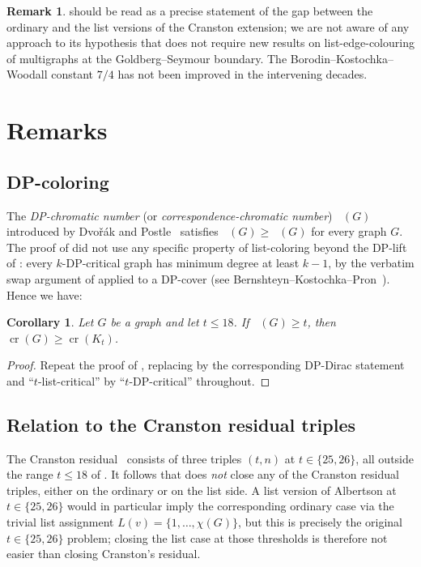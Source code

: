 \documentclass[11pt,a4paper]{article}
\newtheorem{corollary}[theorem]{Corollary}
\theoremstyle{definition}
\newtheorem{remark}[theorem]{Remark}
\DeclareMathOperator{\crN}{cr}
\DeclareMathOperator{\chl}{\chi_{\ell}}
\DeclareMathOperator{\chDP}{\chi_{\mathrm{DP}}}
\begin{document}
\begin{remark}
 should be read as a precise statement of
the gap between the ordinary and the list versions of the
Cranston extension; we are not aware of any approach to its
hypothesis that does not require new results on
list-edge-colouring of multigraphs at the Goldberg--Seymour
boundary. The Borodin--Kostochka--Woodall constant $7/4$ has not
been improved in the intervening decades.
\end{remark}

\section{Remarks}\label{sec:remarks}

\subsection{DP-coloring}

The \emph{DP-chromatic number} (or \emph{correspondence-chromatic
number}) $\chDP(G)$ introduced by Dvo\v{r}\'ak and
Postle~\cite{DP} satisfies $\chDP(G) \ge \chl(G)$ for every graph
$G$. The proof of  did not use any specific
property of list-coloring beyond the DP-lift of
: every $k$-DP-critical graph has minimum
degree at least $k - 1$, by the verbatim swap argument of
 applied to a DP-cover (see
Bernshteyn--Kostochka--Pron~\cite{BKP}). Hence we have:

\begin{corollary}\label{cor:dp}
Let $G$ be a graph and let $t \le 18$. If $\chDP(G) \ge t$, then
$\crN(G) \ge \crN(K_t)$.
\end{corollary}

\begin{proof}
Repeat the proof of , replacing 
by the corresponding DP-Dirac statement and ``$t$-list-critical''
by ``$t$-DP-critical'' throughout.
\end{proof}

\subsection{Relation to the Cranston residual triples}

The Cranston residual~\cite{Cranston} consists of three triples
$(t, n)$ at $t \in \{25, 26\}$, all outside the range
$t \le 18$ of . It follows that 
does \emph{not} close any of the Cranston residual triples,
either on the ordinary or on the list side. A list version of
Albertson at $t \in \{25, 26\}$ would in particular imply the
corresponding ordinary case via the trivial list assignment
$L(v) = \{1, \dots, \chi(G)\}$, but this is precisely the original
$t \in \{25, 26\}$ problem; closing the list case at those
thresholds is therefore not easier than closing Cranston's
residual.
\end{document}
